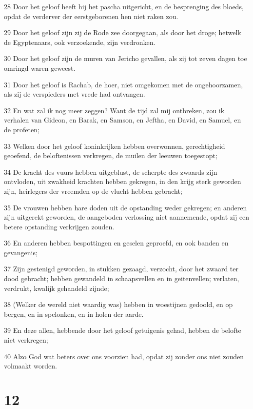 \par 28 Door het geloof heeft hij het pascha uitgericht, en de besprenging des bloeds, opdat de verderver der eerstgeborenen hen niet raken zou.
\par 29 Door het geloof zijn zij de Rode zee doorgegaan, als door het droge; hetwelk de Egyptenaars, ook verzoekende, zijn verdronken.
\par 30 Door het geloof zijn de muren van Jericho gevallen, als zij tot zeven dagen toe omringd waren geweest.
\par 31 Door het geloof is Rachab, de hoer, niet omgekomen met de ongehoorzamen, als zij de verspieders met vrede had ontvangen.
\par 32 En wat zal ik nog meer zeggen? Want de tijd zal mij ontbreken, zou ik verhalen van Gideon, en Barak, en Samson, en Jeftha, en David, en Samuel, en de profeten;
\par 33 Welken door het geloof koninkrijken hebben overwonnen, gerechtigheid geoefend, de beloftenissen verkregen, de muilen der leeuwen toegestopt;
\par 34 De kracht des vuurs hebben uitgeblust, de scherpte des zwaards zijn ontvloden, uit zwakheid krachten hebben gekregen, in den krijg sterk geworden zijn, heirlegers der vreemden op de vlucht hebben gebracht;
\par 35 De vrouwen hebben hare doden uit de opstanding weder gekregen; en anderen zijn uitgerekt geworden, de aangeboden verlossing niet aannemende, opdat zij een betere opstanding verkrijgen zouden.
\par 36 En anderen hebben bespottingen en geselen geproefd, en ook banden en gevangenis;
\par 37 Zijn gestenigd geworden, in stukken gezaagd, verzocht, door het zwaard ter dood gebracht; hebben gewandeld in schaapsvellen en in geitenvellen; verlaten, verdrukt, kwalijk gehandeld zijnde;
\par 38 (Welker de wereld niet waardig was) hebben in woestijnen gedoold, en op bergen, en in spelonken, en in holen der aarde.
\par 39 En deze allen, hebbende door het geloof getuigenis gehad, hebben de belofte niet verkregen;
\par 40 Alzo God wat beters over ons voorzien had, opdat zij zonder ons niet zouden volmaakt worden.

\chapter{12}

